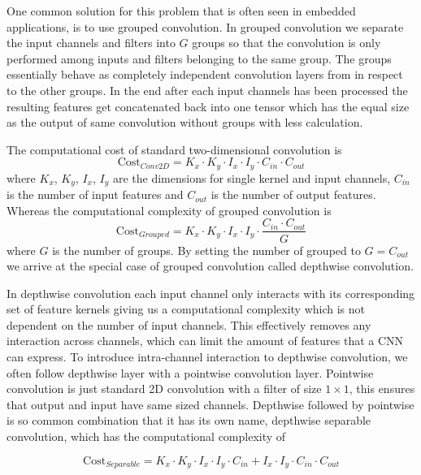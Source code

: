 \documentclass[12pt,a4paper,english
]{tunithesis}
\begin{document}
One common solution for this problem that is often seen in embedded applications, is to use grouped convolution. In grouped convolution we separate the input channels and filters into $G$ groups so that the convolution is only performed among inputs and filters belonging to the same group. The groups essentially behave as completely independent convolution layers from in respect to the other groups.  In the end after each input channels has been processed the resulting features get concatenated back into one tensor which has the equal size as the output of same convolution without groups with less calculation.~\cite{howard2017mobilenetsefficientconvolutionalneural, tan_efficientnet_2020}

The computational cost of standard two-dimensional convolution is
\begin{equation}
\text{Cost}_{Conv2D} = K_{x} \cdot K_{y} \cdot I_{x} \cdot I_{y} \cdot C_{in} \cdot C_{out}
\end{equation}
where $K_{x}$, $K_{y}$, $I_{x}$, $I_{y}$ are the dimensions for single kernel and input channels, $C_{in}$ is the number of input features and $C_{out}$ is the number of output features. Whereas the computational complexity of grouped convolution is
\begin{equation}
\text{Cost}_{Grouped} =
  K_{x} \cdot K_{y} \cdot I_{x} \cdot I_{y} \cdot \frac{C_{in} \cdot C_{out}}{G}
\end{equation}
where $G$ is the number of groups. By setting the number of grouped to $G = C_{out}$ we arrive at the special case of grouped convolution called depthwise convolution.

In depthwise convolution each input channel only interacts with its corresponding set of feature kernels giving us a computational complexity which is not dependent on the number of input channels. This effectively removes any interaction across channels, which can limit the amount of features that a CNN can express. To introduce intra-channel interaction to depthwise convolution, we often follow depthwise layer with a pointwise convolution layer. Pointwise convolution is just standard 2D convolution with a filter of size $1 \times 1$, this ensures that output and input have same sized channels. Depthwise followed by pointwise is so common combination that it has its own name, depthwise separable convolution, which has the computational complexity of

\begin{equation}
\text{Cost}_{Separable} =
  K_{x} \cdot K_{y} \cdot I_{x} \cdot I_{y} \cdot  C_{in} + I_{x} \cdot I_{y} \cdot C_{in} \cdot C_{out}
\end{equation}
\end{document}
